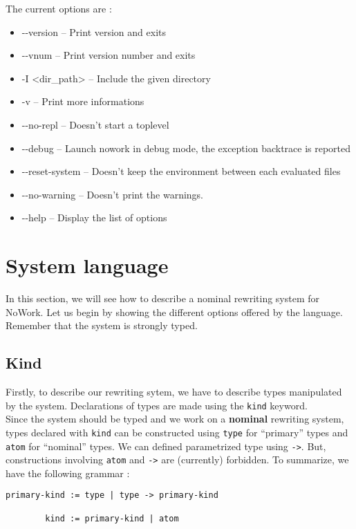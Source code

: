 \documentclass[12pt,a4paper]{article}
\begin{document}
The current options are :
\begin{itemize}
\item -{}-version -- Print version and exits
\item -{}-vnum -- Print version number and exits
\item -I <dir\_path> -- Include the given directory
\item -v -- Print more informations
\item -{}-no-repl -- Doesn't start a toplevel
\item -{}-debug -- Launch nowork in debug mode, the exception backtrace is reported
\item -{}-reset-system -- Doesn't keep the environment between each evaluated files
\item -{}-no-warning -- Doesn't print the warnings.
\item -{}-help -- Display the list of options
\end{itemize}

\section{System language}
In this section, we will see how to describe a nominal rewriting
system for NoWork. Let us begin by showing the different options
offered by the language. Remember that the system is strongly typed.


\subsection{Kind}
Firstly, to describe our rewriting sytem, we have to describe types
manipulated by the system. Declarations of types are made using the
\verb?kind? keyword.\\
Since the system should be typed and we work on a \textbf{nominal}
rewriting system, types declared with \verb?kind? can be constructed using
\verb?type? for ``primary'' types and \verb?atom? for ``nominal''
types. We can defined parametrized type using \verb?->?. But,
constructions involving \verb?atom? and \verb?->? are (currently) forbidden.
To summarize, we have the following grammar :
\begin{verbatim}
primary-kind := type | type -> primary-kind

        kind := primary-kind | atom
\end{verbatim}
\end{document}
